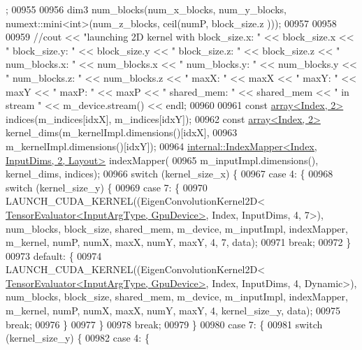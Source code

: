 \begin{DoxyCode}
      ;
00955 
00956         dim3 num\_blocks(num\_x\_blocks, num\_y\_blocks, numext::mini<int>(num\_z\_blocks, ceil(numP, block\_size.z
      )));
00957 
00958 
00959         \textcolor{comment}{//cout << "launching 2D kernel with block\_size.x: " << block\_size.x << " block\_size.y: " <<
       block\_size.y  << " block\_size.z: " << block\_size.z << " num\_blocks.x: " << num\_blocks.x << " num\_blocks.y: " <<
       num\_blocks.y << " num\_blocks.z: " << num\_blocks.z << " maxX: " << maxX << " maxY: " << maxY << " maxP: " <<
       maxP << " shared\_mem: " << shared\_mem << " in stream " << m\_device.stream() << endl;}
00960 
00961         \textcolor{keyword}{const} \hyperlink{class_eigen_1_1array}{array<Index, 2>} indices(m\_indices[idxX], m\_indices[idxY]);
00962         \textcolor{keyword}{const} \hyperlink{class_eigen_1_1array}{array<Index, 2>} kernel\_dims(m\_kernelImpl.dimensions()[idxX],
00963                                           m\_kernelImpl.dimensions()[idxY]);
00964         \hyperlink{class_eigen_1_1internal_1_1_index_mapper}{internal::IndexMapper<Index, InputDims, 2, Layout>}
       indexMapper(
00965             m\_inputImpl.dimensions(), kernel\_dims, indices);
00966         \textcolor{keywordflow}{switch} (kernel\_size\_x) \{
00967           \textcolor{keywordflow}{case} 4: \{
00968             \textcolor{keywordflow}{switch} (kernel\_size\_y) \{
00969               \textcolor{keywordflow}{case} 7: \{
00970                 LAUNCH\_CUDA\_KERNEL((EigenConvolutionKernel2D<
      \hyperlink{struct_eigen_1_1_tensor_evaluator}{TensorEvaluator<InputArgType, GpuDevice>}, Index, InputDims, 4, 7>),
       num\_blocks, block\_size, shared\_mem, m\_device, m\_inputImpl, indexMapper, m\_kernel, numP, numX, maxX, numY, 
      maxY, 4, 7, data);
00971                 \textcolor{keywordflow}{break};
00972               \}
00973               \textcolor{keywordflow}{default}: \{
00974                 LAUNCH\_CUDA\_KERNEL((EigenConvolutionKernel2D<
      \hyperlink{struct_eigen_1_1_tensor_evaluator}{TensorEvaluator<InputArgType, GpuDevice>}, Index, InputDims, 4, 
      Dynamic>), num\_blocks, block\_size, shared\_mem, m\_device, m\_inputImpl, indexMapper, m\_kernel, numP, numX, maxX, 
      numY, maxY, 4, kernel\_size\_y, data);
00975                 \textcolor{keywordflow}{break};
00976               \}
00977             \}
00978             \textcolor{keywordflow}{break};
00979           \}
00980           \textcolor{keywordflow}{case} 7: \{
00981             \textcolor{keywordflow}{switch} (kernel\_size\_y) \{
00982               \textcolor{keywordflow}{case} 4: \{

\end{DoxyCode}
